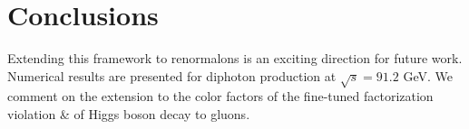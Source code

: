 \section{Conclusions}\label{sec:conclusions}

Extending this framework to renormalons is an exciting direction for
future work. Numerical results are presented for diphoton production at
$\sqrt{s} = 91.2$ GeV. We comment on the extension to the color factors
of the fine-tuned factorization violation & of Higgs boson decay to
gluons.

